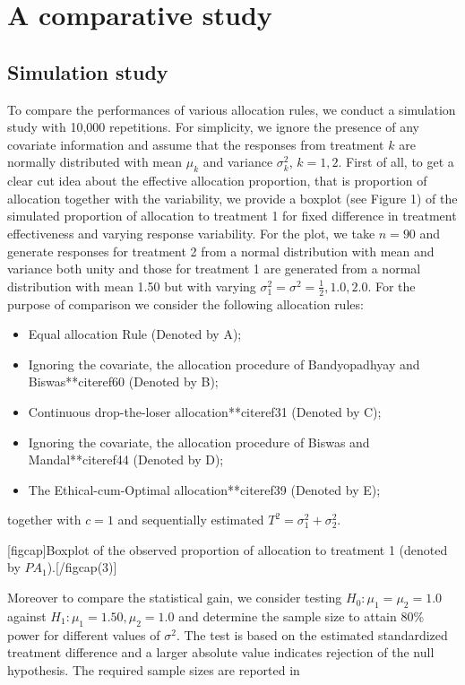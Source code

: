 \section{A comparative study}

\subsection{Simulation study}

To compare the performances of various allocation rules, we conduct a simulation study with 10,000 repetitions. For simplicity, we ignore the presence of any covariate information and assume that the responses from treatment $k$ are normally distributed with mean $\mu_{k}$ and variance $\sigma^{2}_{k}$, $k=1,2$. First of all, to get a clear cut idea about the effective allocation proportion, that is proportion of allocation together with the variability, we provide a boxplot (see Figure 1) of the simulated proportion of allocation  to treatment 1 for fixed difference in treatment effectiveness and varying  response variability. For the plot, we take $n=90$ and generate responses for treatment 2 from a normal distribution with mean and variance both unity and those for treatment 1 are generated from a normal distribution with mean 1.50 but with varying $\sigma_{1}^{2}=\sigma^{2}=\frac{1}{2},1.0, 2.0$. For the purpose of comparison we consider the following allocation rules:
\begin{itemize}
\item Equal allocation Rule (Denoted by A);
\item Ignoring the covariate, the  allocation procedure  of Bandyopadhyay and Biswas**citeref{60} (Denoted by B);
\item Continuous drop-the-loser allocation**citeref{31} (Denoted by C);
\item Ignoring the covariate, the  allocation procedure of Biswas and Mandal**citeref{44} (Denoted by D);
\item The Ethical-cum-Optimal allocation**citeref{39} (Denoted by E);
\end{itemize}
together with  $c=1$ and sequentially estimated $T^{2}=\sigma_{1}^{2}+\sigma_{2}^{2}$.


[figcap]Boxplot of the observed proportion of allocation to treatment 1 (denoted by $PA_1$).[/figcap(3)]

\newline
 \noindent Moreover to compare the statistical gain, we consider testing $H_{0}:\mu_{1}=\mu_{2}=1.0$ against $H_{1}:\mu_{1}=1.50, \mu_{2}=1.0$ and determine the sample size to attain 80\% power for different values of $\sigma^{2}$. The test is based on the estimated standardized treatment difference and a larger absolute value indicates rejection of the null hypothesis. The required sample sizes are reported in 


